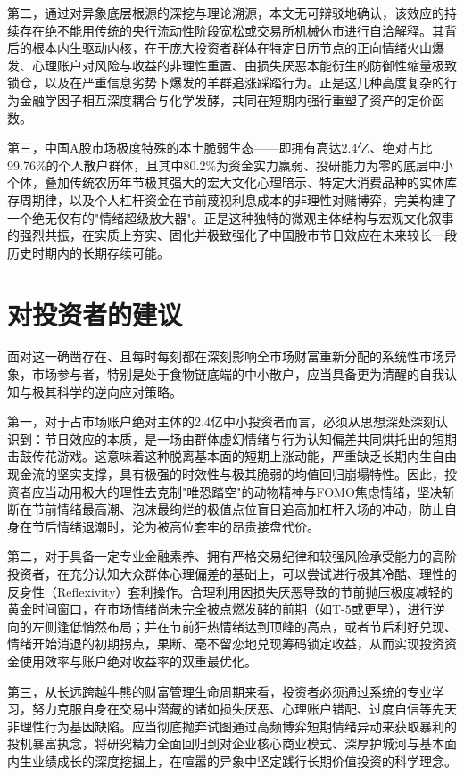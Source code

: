 \documentclass{cupb-thesis}
\begin{document}
{第二，通过对异象底层根源的深挖与理论溯源，本文无可辩驳地确认，该效应的持续存在绝不能用传统的央行流动性阶段宽松或交易所机械休市进行自洽解释。其背后的根本内生驱动内核，在于庞大投资者群体在特定日历节点的正向情绪火山爆发、心理账户对风险与收益的非理性重置、由损失厌恶本能衍生的防御性缩量极致锁仓，以及在严重信息劣势下爆发的羊群追涨踩踏行为。正是这几种高度复杂的行为金融学因子相互深度耦合与化学发酵，共同在短期内强行重塑了资产的定价函数。

第三，中国A股市场极度特殊的本土脆弱生态——即拥有高达2.4亿、绝对占比99.76\%的个人散户群体，且其中80.2\%为资金实力羸弱、投研能力为零的底层中小个体，叠加传统农历年节极其强大的宏大文化心理暗示、特定大消费品种的实体库存周期律，以及个人杠杆资金在节前蔑视利息成本的非理性对赌博弈，完美构建了一个绝无仅有的"情绪超级放大器"。正是这种独特的微观主体结构与宏观文化叙事的强烈共振，在实质上夯实、固化并极致强化了中国股市节日效应在未来较长一段历史时期内的长期存续可能。


\section{对投资者的建议}


面对这一确凿存在、且每时每刻都在深刻影响全市场财富重新分配的系统性市场异象，市场参与者，特别是处于食物链底端的中小散户，应当具备更为清醒的自我认知与极其科学的逆向应对策略。


第一，对于占市场账户绝对主体的2.4亿中小投资者而言，必须从思想深处深刻认识到：节日效应的本质，是一场由群体虚幻情绪与行为认知偏差共同烘托出的短期击鼓传花游戏。这意味着这种脱离基本面的短期上涨动能，严重缺乏长期内生自由现金流的坚实支撑，具有极强的时效性与极其脆弱的均值回归崩塌特性。因此，投资者应当动用极大的理性去克制"唯恐踏空"的动物精神与FOMO焦虑情绪，坚决斩断在节前情绪最高潮、泡沫最绚烂的极值点位盲目追高加杠杆入场的冲动，防止自身在节后情绪退潮时，沦为被高位套牢的昂贵接盘代价。

第二，对于具备一定专业金融素养、拥有严格交易纪律和较强风险承受能力的高阶投资者，在充分认知大众群体心理偏差的基础上，可以尝试进行极其冷酷、理性的反身性（Reflexivity）套利操作。合理利用因损失厌恶导致的节前抛压极度减轻的黄金时间窗口，在市场情绪尚未完全被点燃发酵的前期（如T-5或更早），进行逆向的左侧逢低悄然布局；并在节前狂热情绪达到顶峰的高点，或者节后利好兑现、情绪开始消退的初期拐点，果断、毫不留恋地兑现筹码锁定收益，从而实现投资资金使用效率与账户绝对收益率的双重最优化。

第三，从长远跨越牛熊的财富管理生命周期来看，投资者必须通过系统的专业学习，努力克服自身在交易中潜藏的诸如损失厌恶、心理账户错配、过度自信等先天非理性行为基因缺陷。应当彻底抛弃试图通过高频博弈短期情绪异动来获取暴利的投机暴富执念，将研究精力全面回归到对企业核心商业模式、深厚护城河与基本面内生业绩成长的深度挖掘上，在喧嚣的异象中坚定践行长期价值投资的科学理念。


}
\end{document}
